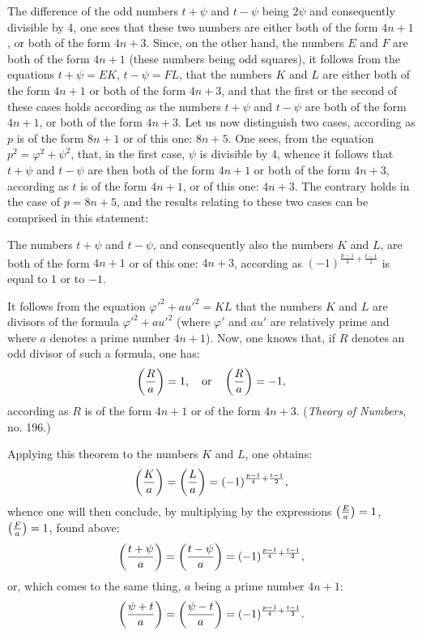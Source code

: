 \par\indent
The difference of the odd numbers $t+\psi$ and $t-\psi$ being $2\psi$ and consequently
divisible by 4, one sees that these two numbers are either both
of the form $4n+1$, or both of the form $4n+3$. Since, on the other
hand, the numbers $E$ and $F$ are both of the form $4n+1$ (these numbers
being odd squares), it follows from the equations $t+\psi=EK$, $t-\psi=FL$, that
the numbers $K$ and $L$ are either both of the form $4n+1$ or both
of the form $4n+3$, and that the first or the second of these cases holds according
as the numbers $t+\psi$ and $t-\psi$ are both of the form $4n+1$, or both
of the form $4n+3$. Let us now distinguish two cases, according as $p$
is of the form $8n+1$ or of this one: $8n+5$. One sees, from the equation
$p^2=\varphi^2+\psi^2$, that, in the first case, $\psi$ is divisible by 4, whence it follows that
$t+\psi$ and $t-\psi$ are then both of the form $4n+1$ or both
of the form $4n+3$, according as $t$ is of the form $4n+1$, or of this one: $4n+3$.
The contrary holds in the case of $p=8n+5$, and the results relating to these
two cases can be comprised in this statement:
\par\indent
The numbers $t+\psi$ and $t-\psi$, and consequently also the numbers $K$ and
$L$, are both of the form $4n+1$ or of this one: $4n+3$, according as
$(-1)^{\frac{p-1}{4}+\frac{t-1}{2}}$ is equal to 1 or to $-1$.
\par\indent
It follows from the equation $\varphi'^2+au'^2=KL$ that the numbers $K$ and $L$ are
divisors of the formula $\varphi'^2+au'^2$ (where $\varphi'$ and $au'$ are relatively prime and where
$a$ denotes a prime number $4n+1$). Now, one knows that, if $R$ denotes an
odd divisor of such a formula, one has:
\[
\left(\frac{R}{a}\right)=1,\quad\text{or}\quad\left(\frac{R}{a}\right)=-1,
\]
according as $R$ is of the form $4n+1$ or of the form $4n+3$. (\emph{Theory of
Numbers}, no. 196.)
\par\indent
Applying this theorem to the numbers $K$ and $L$, one obtains:
\[
\left(\frac{K}{a}\right)=\left(\frac{L}{a}\right)=(-1)^{\frac{p-1}{4}+\frac{t-1}{2}},
\]
whence one will then conclude, by multiplying by the expressions $\left(\frac{E}{a}\right)=1$,
$\left(\frac{F}{a}\right)=1$, found above:
\[
\left(\frac{t+\psi}{a}\right)=\left(\frac{t-\psi}{a}\right)=(-1)^{\frac{p-1}{4}+\frac{t-1}{2}},
\]
or, which comes to the same thing, $a$ being a prime number $4n+1$:
\[
\left(\frac{\psi+t}{a}\right)=\left(\frac{\psi-t}{a}\right)=(-1)^{\frac{p-1}{4}+\frac{t-1}{2}}.
\]
